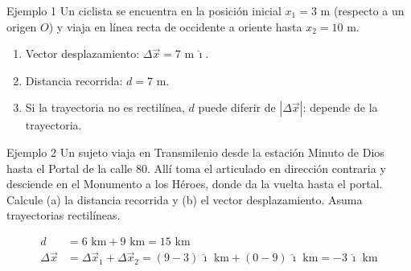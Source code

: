 \documentclass[aspectratio=169,xcolor=dvipsnames]{beamer}
\newcommand{\ii}{\hat{\imath}}
\begin{document}
\begin{frame}{Ejemplo 1}
Un ciclista se encuentra en la posición inicial $x_1=3$ m (respecto a un origen $O$) y viaja en línea recta de occidente a oriente hasta $x_2=10$ m.
\begin{center}
\end{center}
\begin{enumerate}
\item Vector desplazamiento: $\Delta \vec x = 7\text{ m}\,\ii$.
\item Distancia recorrida: $d = 7$ m.
\item Si la trayectoria no es rectilínea, $d$ puede diferir de $|\Delta\vec x|$: depende de la trayectoria.
\end{enumerate}
\end{frame}

\begin{frame}{Ejemplo 2}
\small Un sujeto viaja en Transmilenio desde la estación Minuto de Dios hasta el Portal de la calle 80. Allí toma el articulado en dirección contraria y desciende en el Monumento a los Héroes, donde da la vuelta hasta el portal. Calcule (a) la distancia recorrida y (b) el vector desplazamiento. Asuma trayectorias rectilíneas.
\begin{center}
\end{center}
\vspace{0.3cm}
\begin{align*}
d &= 6\text{ km} + 9\text{ km} = 15\text{ km}\\
\Delta \vec x &= \Delta\vec x_1 + \Delta \vec x_2 = (9-3)\,\ii\text{ km} + (0-9)\,\ii\text{ km} = -3\,\ii \text{ km}
\end{align*}
\end{frame}
\end{document}
